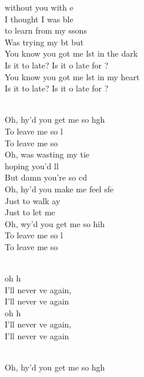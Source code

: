 \begin{cancion}
	without you with e\\
	I thought I was ble \\
	to learn from my ssons\\
	Was trying my bt but\\
\jump
	You know you got me lst in the dark\\
	Is it to late? Is it o late for ?\\
	You know you got me lst in my heart\\
	Is it to late? Is it o late for ?\\\jump\\
	\begin{chorus}%
	Oh, hy'd you get me so hgh\\
	To leave me so l\\
	To leave me so\\
	Oh,  was wasting my tie \\
	hoping you'd ll\\
	But damn you're so cd\\
	Oh, hy'd you make me feel sfe\\
	Just to walk ay\\
	Just to let me \\
	Oh, wy'd you get me so hih\\
	To leave me so l\\
	To leave me so\\
	\end{chorus}%
	\jump\\
	oh h\\
	I'll never ve again, \\
	I'll never ve again\\
	oh h\\
	I'll never ve again, \\
	I'll never ve again\\\jump\\
	\begin{chorus}%
	Oh, hy'd you get me so hgh\\

\end{chorus}
\end{cancion}
